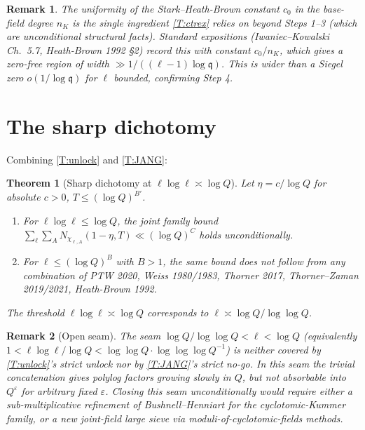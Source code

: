 \documentclass[11pt]{article}
\newtheorem{theorem}{Theorem}
\newtheorem{remark}{Remark}
\begin{document}
\begin{remark}
The uniformity of the Stark--Heath-Brown constant $c_0$ in the base-field degree $n_K$ is the single ingredient \cref{T:ctrex} relies on beyond Steps 1--3 (which are unconditional structural facts).  Standard expositions (Iwaniec--Kowalski Ch.~5.7, Heath-Brown 1992 \S 2) record this with constant $c_0/n_K$, which gives a zero-free region of width $\gg 1/((\ell-1)\log\mathfrak q)$.  This is wider than a Siegel zero $o(1/\log\mathfrak q)$ for $\ell$ bounded, confirming Step 4.
\end{remark}

\section{The sharp dichotomy}\label{S:dichotomy}

Combining \cref{T:unlock} and \cref{T:JANG}:

\begin{theorem}[Sharp dichotomy at $\ell\log\ell\asymp\log Q$]\label{T:dichotomy}
Let $\eta=c/\log Q$ for absolute $c>0$, $T\le(\log Q)^{B'}$.
\begin{enumerate}[label=(\alph*)]
\item For $\ell\log\ell\le\log Q$, the joint family bound $\sum_\ell\sum_A N_{\chi_{\ell,A}}(1-\eta,T)\ll(\log Q)^C$ holds unconditionally.
\item For $\ell\le(\log Q)^B$ with $B>1$, the same bound does not follow from any combination of {PTW 2020, Weiss 1980/1983, Thorner 2017, Thorner--Zaman 2019/2021, Heath-Brown 1992}.
\end{enumerate}
The threshold $\ell\log\ell\asymp\log Q$ corresponds to $\ell\asymp\log Q/\log\log Q$.
\end{theorem}

\begin{remark}[Open seam]
The seam $\log Q/\log\log Q<\ell<\log Q$ (equivalently $1<\ell\log\ell/\log Q<\log\log Q\cdot\log\log\log Q^{-1}$) is neither covered by \cref{T:unlock}'s strict unlock nor by \cref{T:JANG}'s strict no-go.  In this seam the trivial concatenation gives polylog factors growing slowly in $Q$, but not absorbable into $Q^\varepsilon$ for arbitrary fixed $\varepsilon$.  Closing this seam unconditionally would require either a sub-multiplicative refinement of Bushnell--Henniart for the cyclotomic-Kummer family, or a new joint-field large sieve via moduli-of-cyclotomic-fields methods.
\end{remark}
\end{document}
